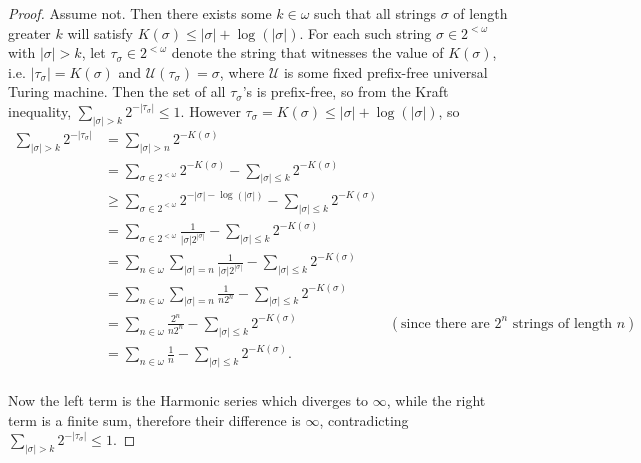 \documentclass{article}
\begin{document}
\begin{enumerate}
    \begin{proof}
      Assume not. Then there exists some $k\in\omega$ such that all strings
      $\sigma$ of length greater $k$ will satisfy
      $K(\sigma)\leq|\sigma|+\log(|\sigma|)$. For each such string
      $\sigma\in 2^{<\omega}$ with $|\sigma|>k$, let
      $\tau_\sigma\in2^{<\omega}$ denote the string that witnesses the
      value of $K(\sigma)$, i.e.
      $|\tau_\sigma|=K(\sigma)$ and $\mathcal{U}(\tau_\sigma)=\sigma$, where
      $\mathcal{U}$ is some fixed prefix-free universal Turing machine.
      Then the set of all $\tau_\sigma$'s is prefix-free, so from
      the Kraft inequality, $\sum_{|\sigma|>k} 2^{-|\tau_\sigma|} \leq 1$.
      However $\tau_\sigma=K(\sigma) \leq |\sigma|+\log(|\sigma|)$, so
      \begin{align*}
        \sum_{|\sigma|>k} 2^{-|\tau_\sigma|} &=\sum_{|\sigma|>n}
          2^{-K(\sigma)} \\
        &=\sum_{\sigma\in 2^{<\omega}} 2^{-K(\sigma)} -\sum_{|\sigma|\leq
          k} 2^{-K(\sigma)} \\
        &\geq \sum_{\sigma\in 2^{<\omega}} 2^{-|\sigma|-\log(|\sigma|)}
          -\sum_{|\sigma|\leq k} 2^{-K(\sigma)}\\
        &=\sum_{\sigma\in 2^{<\omega}} \frac{1}{|\sigma|2^{|\sigma|}}
          -\sum_{|\sigma|\leq k} 2^{-K(\sigma)}\\
        &=\sum_{n\in\omega} \sum_{|\sigma|=n}
          \frac{1}{|\sigma|2^{|\sigma|}} -\sum_{|\sigma|\leq k}
          2^{-K(\sigma)}\\
        &=\sum_{n\in\omega} \sum_{|\sigma|=n}
          \frac{1}{n2^{n}} -\sum_{|\sigma|\leq k} 2^{-K(\sigma)}\\
        &=\sum_{n\in\omega}
          \frac{2^n}{n2^{n}} -\sum_{|\sigma|\leq k} 2^{-K(\sigma)}
          &(\text{since there are $2^n$ strings of length $n$})\\
        &=\sum_{n\in\omega} \frac{1}{n} -\sum_{|\sigma|\leq k}
          2^{-K(\sigma)}.\\
      \end{align*}

      Now the left term is the Harmonic series which diverges to $\infty$,
      while the right term is a finite sum, therefore their difference is
      $\infty$, contradicting $\sum_{|\sigma|>k} 2^{-|\tau_\sigma|} \leq
      1$.
    \end{proof}
\end{enumerate}
\end{document}

